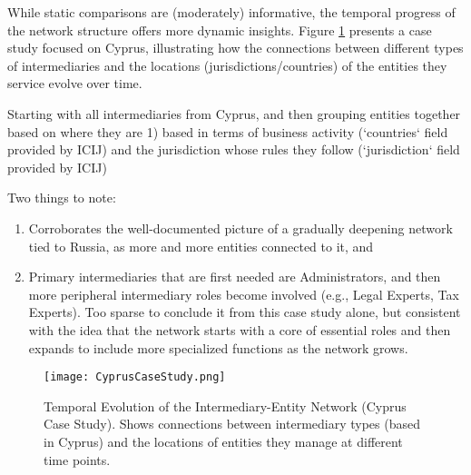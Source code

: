 While static comparisons are (moderately) informative, the temporal progress of the network structure offers more dynamic insights. Figure \ref{fig:cyprus_temporal} presents a case study focused on Cyprus, illustrating how the connections between different types of intermediaries and the locations (jurisdictions/countries) of the entities they service evolve over time.

Starting with all intermediaries from Cyprus, and then grouping entities together based on where they are 1) based in terms of business activity (`countries` field provided by ICIJ) and the jurisdiction whose rules they follow (`jurisdiction` field provided by ICIJ)

Two things to note:
\begin{enumerate}
    \item Corroborates the well-documented picture of a gradually deepening network tied to Russia, as more and more entities connected to it, and 
    \item Primary intermediaries that are first needed are Administrators, and then more peripheral intermediary roles become involved (e.g., Legal Experts, Tax Experts). Too sparse to conclude it from this case study alone, but consistent with the idea that the network starts with a core of essential roles and then expands to include more specialized functions as the network grows.
\end{enumerate}
\begin{figure}[htbp]
    \centering
    \texttt{[image: CyprusCaseStudy.png]} 
    \caption{Temporal Evolution of the Intermediary-Entity Network (Cyprus Case Study). Shows connections between intermediary types (based in Cyprus) and the locations of entities they manage at different time points.}
    \label{fig:cyprus_temporal}
\end{figure}


